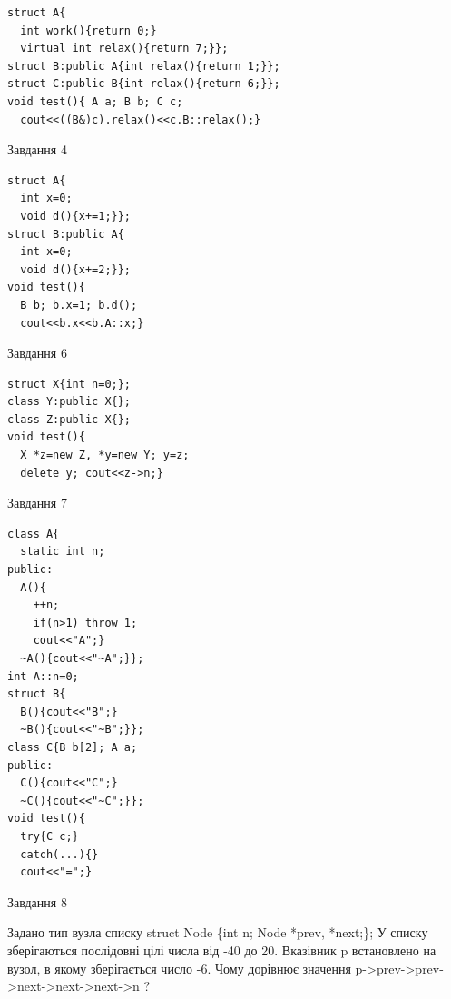 \documentclass[12pt, ukrainian]{article}
\begin{document}
{{{{{{{{{{{{{{{\begin{minipage}[t]{11cm}
\begin{verbatim}
struct A{
  int work(){return 0;}
  virtual int relax(){return 7;}};
struct B:public A{int relax(){return 1;}};
struct C:public B{int relax(){return 6;}};
void test(){ A a; B b; C c;
  cout<<((B&)c).relax()<<c.B::relax();}
\end{verbatim}            


\end{minipage}
\vline \hspace{8mm}
\begin{minipage}[t]{7cm}
               
{\begin{center}Завдання {4}\end{center}}
\vspace{-6mm}

\begin{verbatim}
struct A{
  int x=0;
  void d(){x+=1;}};
struct B:public A{
  int x=0;
  void d(){x+=2;}};
void test(){
  B b; b.x=1; b.d();
  cout<<b.x<<b.A::x;}
\end{verbatim}            


               
{\begin{center}Завдання {6}\end{center}}
\vspace{-6mm}

\begin{verbatim}
struct X{int n=0;};
class Y:public X{};
class Z:public X{};
void test(){
  X *z=new Z, *y=new Y; y=z;
  delete y; cout<<z->n;}
\end{verbatim}            


               
{\begin{center}Завдання {7}\end{center}}
\vspace{-6mm}

\begin{verbatim}
class A{
  static int n;
public:
  A(){
    ++n; 
    if(n>1) throw 1;
    cout<<"A";}
  ~A(){cout<<"~A";}};
int A::n=0;
struct B{
  B(){cout<<"B";}
  ~B(){cout<<"~B";}};
class C{B b[2]; A a;
public:
  C(){cout<<"C";}
  ~C(){cout<<"~C";}};
void test(){
  try{C c;} 
  catch(...){} 
  cout<<"=";}
\end{verbatim}            


\end{minipage}
               
{\begin{center}Завдання {8}\end{center}}
\vspace{-6mm}
Задано тип вузла списку
struct Node \{int n; Node *prev, *next;\};
У списку зберігаються послідовні цілі числа від -40 до 20. Вказівник p встановлено на вузол, в якому зберігається число -6.
Чому дорівнює значення p->prev->prev->next->next->next->n ?\par

}}}}}}}}}}}}}}}
\end{document}
